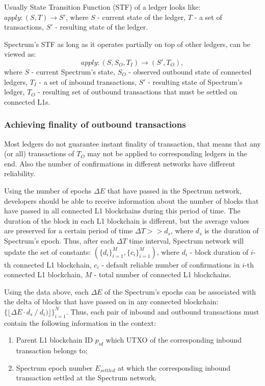 Usually State Transition Function (STF) of a ledger looks like: ${apply: (S, T) \rightarrow S'}$,
where $S$ - current state of the ledger, $T$ - a set of transactions, $S'$ - resulting state of the ledger.

Spectrum's STF as long as it operates partially on top of other ledgers, can be viewed as:
\begin{equation}
    apply:(S, S_O, T_I) \rightarrow (S', T_O),\label{eq:equation1}
\end{equation}
where $S$ - current Spectrum's state, $S_O$ - observed outbound state of connected ledgers, $T_I$ - a set of inbound transactions, $S'$ - resulting state of Spectrum's ledger, $T_O$ - resulting set of outbound transactions that must be settled on connected L1s.

\subsubsection{Achieving finality of outbound transactions}
Most ledgers do not guarantee instant finality of transaction, that means that any (or all) transactions of $T_O$ may not be applied to corresponding ledgers in the end.
Also the number of confirmations in different networks have different reliability.

Using the number of epochs $\Delta E$ that have passed in the Spectrum network, developers should be able to receive information about the number of blocks that have passed in all connected L1 blockchains during this period of time.
The duration of the block in each L1 blockchain is different, but the average values are preserved for a certain period of time ${\Delta T >> d_s}$, where $d_s$ is the duration of Spectrum's epoch.
Thus, after each $\Delta T$ time interval, Spectrum network will update the set of constants: ${(\{d_{i}\}_{i=1}^{M},\{c_{i}\}_{i=1}^{M})}$, where $d_i$ - block duration of $i$-th connected L1 blockchain, $c_i$ - default reliable number of confirmations in $i$-th connected L1 blockchain, $M$ - total number of connected L1 blockchains.

Using the data above, each $\Delta E$ of the Spectrum's epochs can be associated with the delta of blocks that have passed on in any connected blockchain: ${\{\lfloor \Delta E \cdot d_s \mathbin{/} d_i)\rfloor\}_{i=1}^{N}}$.
Thus, each pair of inbound and outbound transactions must contain the following information in the context:
\begin{enumerate}
    \item Parent L1 blockchain ID $p_{id}$ which UTXO of the corresponding inbound transaction belongs to;
    \item Spectrum epoch number $E_{settled}$ at which the corresponding inbound transaction settled at the Spectrum network.
\end{enumerate}

